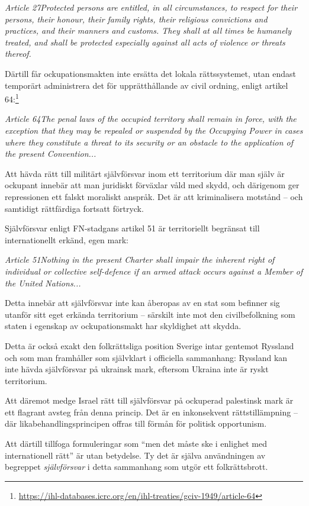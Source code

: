 \documentclass[12pt]{article}
\newcommand{\lagrum}[1]{\par\vspace{3mm}\textit{#1}\par\vspace{5mm}}
\begin{document}
\lagrum{Article 27\quad Protected persons are entitled, in all circumstances, to respect for their persons, their honour, their family rights, their religious convictions and practices, and their manners and customs. They shall at all times be humanely treated, and shall be protected especially against all acts of violence or threats thereof.}

Därtill får ockupationsmakten inte ersätta det lokala rättssystemet, utan endast temporärt administrera det för upprätthållande av civil ordning, enligt artikel 64:\footnote{\url{https://ihl-databases.icrc.org/en/ihl-treaties/gciv-1949/article-64}}

\lagrum{Article 64\quad The penal laws of the occupied territory shall remain in force, with the exception that they may be repealed or suspended by the Occupying Power in cases where they constitute a threat to its security or an obstacle to the application of the present Convention...}

Att hävda rätt till militärt självförsvar inom ett territorium där man själv är ockupant innebär att man juridiskt förväxlar våld med skydd, och därigenom ger repressionen ett falskt moraliskt anspråk. Det är att kriminalisera motstånd – och samtidigt rättfärdiga fortsatt förtryck.

Självförsvar enligt FN-stadgans artikel 51 är territoriellt begränsat till internationellt erkänd, egen mark:

\lagrum{Article 51\quad Nothing in the present Charter shall impair the inherent right of individual or collective self-defence if an armed attack occurs against a Member of the United Nations...}

Detta innebär att självförsvar inte kan åberopas av en stat som befinner sig utanför sitt eget erkända territorium – särskilt inte mot den civilbefolkning som staten i egenskap av ockupationsmakt har skyldighet att skydda.

Detta är också exakt den folkrättsliga position Sverige intar gentemot Ryssland och som man framhåller som självklart i officiella sammanhang: Ryssland kan inte hävda självförsvar på ukrainsk mark, eftersom Ukraina inte är ryskt territorium.  

Att däremot medge Israel rätt till självförsvar på ockuperad palestinsk mark är ett flagrant avsteg från denna princip. Det är en inkonsekvent rättstillämpning – där likabehandlingsprincipen offras till förmån för politisk opportunism.


Att därtill tillfoga formuleringar som \enquote{men det måste ske i enlighet med internationell rätt} är utan betydelse. Ty det är själva användningen av begreppet \textit{självförsvar} i detta sammanhang som utgör ett folkrättsbrott.
\end{document}
